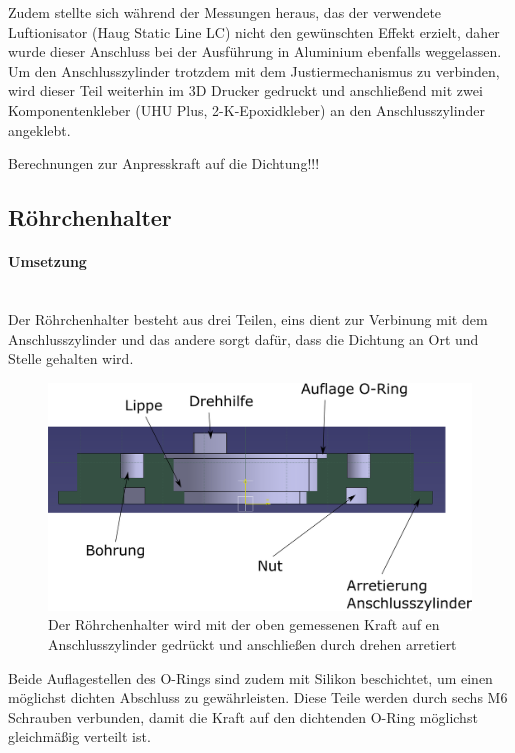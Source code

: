 Zudem stellte sich während der Messungen heraus, das der verwendete Luftionisator (Haug Static Line LC) nicht den gewünschten Effekt erzielt, daher wurde dieser Anschluss bei der Ausführung in Aluminium ebenfalls weggelassen. Um den Anschlusszylinder trotzdem mit dem Justiermechanismus zu verbinden, wird dieser Teil weiterhin im 3D Drucker gedruckt und anschließend mit zwei Komponentenkleber (UHU Plus, 2-K-Epoxidkleber) an den Anschlusszylinder angeklebt.

Berechnungen zur Anpresskraft auf die Dichtung!!!

\subsection{Röhrchenhalter}

\paragraph{Umsetzung}

\hfill \\

Der Röhrchenhalter besteht aus drei Teilen, eins dient zur Verbinung mit dem Anschlusszylinder und das andere sorgt dafür, dass die Dichtung an Ort und Stelle gehalten wird. 

\begin{figure}[h]
	\begin{center}
		\includegraphics[scale=0.5]{Schnitt_Roehrchenhalter.png}
		\caption[Schnitt Röhrchenhalter]{Der Röhrchenhalter wird mit der oben gemessenen Kraft auf en Anschlusszylinder gedrückt und anschließen durch drehen arretiert}
	\end{center}
\end{figure}

Beide Auflagestellen des O-Rings sind zudem mit Silikon beschichtet, um einen möglichst dichten Abschluss zu gewährleisten.
Diese Teile werden durch sechs M6 Schrauben verbunden, damit die Kraft auf den dichtenden O-Ring möglichst gleichmäßig verteilt ist. \\


